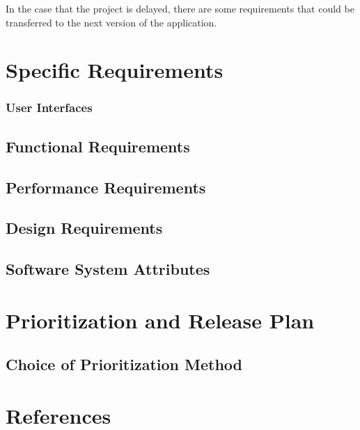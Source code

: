 \documentclass[a4paper,10pt]{article} \usepackage[margin=1.0in]{geometry} \usepackage{pdfpages} \usepackage{graphicx}
\begin{document}
In the case that the project is delayed, there are some requirements that could be transferred to the next version of the application. 

\newpage

\section{Specific Requirements}
\subsubsection{User Interfaces}
\subsection{Functional Requirements}
\subsection{Performance Requirements}
\subsection{Design Requirements}
\subsection{Software System Attributes}
\newpage

\section{Prioritization and Release Plan}
\subsection{Choice of Prioritization Method}

\newpage
\section{References}
\newpage
\end{document}
